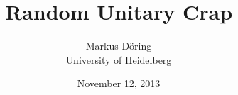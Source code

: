 \title{Random Unitary Crap}
\date{November 12, 2013}
\author{Markus D\"oring\\University of Heidelberg}
\maketitle